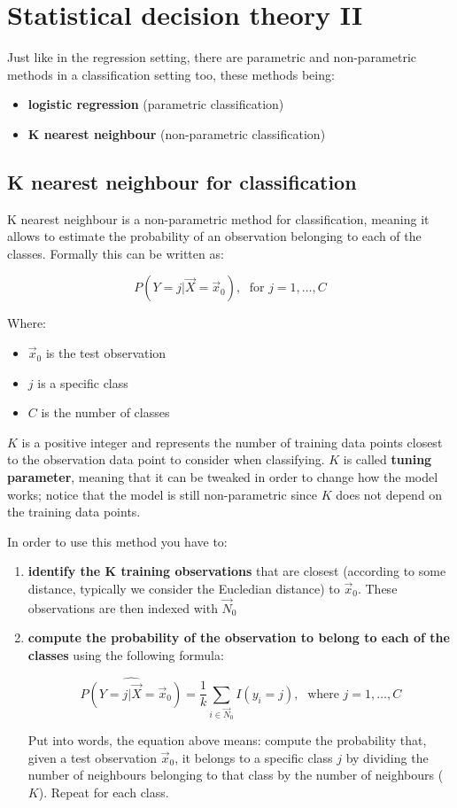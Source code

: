 \chapter{Statistical decision theory II}
  Just like in the regression setting, there are parametric and non-parametric methods in a classification setting too, these methods being:
  \begin{itemize}
    \item \textbf{logistic regression} (parametric classification)
    \item \textbf{K nearest neighbour} (non-parametric classification)
  \end{itemize}

  \section{K nearest neighbour for classification}
    K nearest neighbour is a non-parametric method for classification, meaning it allows to estimate the probability of an observation belonging to each of the classes. Formally this can be written as:

    $$P(Y = j | \vec{X} = \vec{x}_0), \; \text{ for } j = 1, \dots, C$$ 

    Where:
    \begin{itemize}
      \item $\vec{x}_0$ is the test observation
      \item $j$ is a specific class
      \item $C$ is the number of classes
    \end{itemize}
    
    $K$ is a positive integer and represents the number of training data points closest to the observation data point to consider when classifying. $K$ is called \textbf{tuning parameter}, meaning that it can be tweaked in order to change how the model works; notice that the model is still non-parametric since $K$ does not depend on the training data points.

    In order to use this method you have to: 
    \begin{enumerate}
      \item \textbf{identify the K training observations} that are closest (according to some distance, typically we consider the Eucledian distance) to $\vec{x}_0$. These observations  are then indexed with $\vec{N}_0$

      \item \textbf{compute the probability of the observation to belong to each of the classes} using the following formula:

      $$
      \hat{P(Y = j | \vec{X} = \vec{x}_0)} = \frac{1}{k}\sum_{i \in \vec{N}_0}{I(y_i = j)},\;
      \text{ where } j = 1, \dots, C
      $$

      Put into words, the equation above means: compute the probability that, given a test observation $\vec{x}_0$, it belongs to a specific class $j$ by dividing the number of neighbours belonging to that class by the number of neighbours ($K$). Repeat for each class.
    \end{enumerate} 

